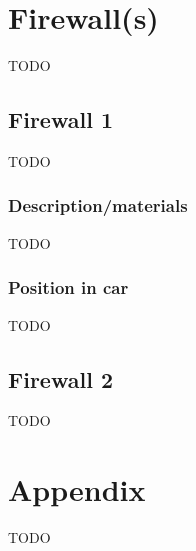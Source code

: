 \documentclass{article}
\begin{document}
\section{Firewall(s)}
TODO

\subsection{Firewall 1}
TODO

\subsubsection{Description/materials}
TODO

\subsubsection{Position in car}
TODO

\subsection{Firewall 2}
TODO

\section{Appendix}
TODO
\end{document}
